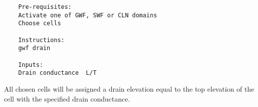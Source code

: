     \begin{verbatim}
    Pre-requisites: 
    Activate one of GWF, SWF or CLN domains
    Choose cells
    
    Instructions:
    gwf drain
    
    Inputs: 
    Drain conductance  L/T
    \end{verbatim}
    
    All chosen cells will be assigned a drain elevation equal to the top elevation of the cell with the specified drain conductance.